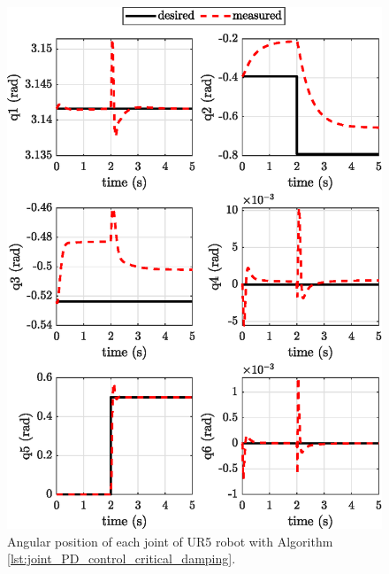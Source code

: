 \begin{figure}
    \centering
    \includegraphics{images/act_1.5/joint_position.eps}
    \caption{Angular position of each joint of UR5 robot with Algorithm \ref{lst:joint_PD_control_critical_damping}.}
    \label{fig:act_1.5_joint_position}
\end{figure}

